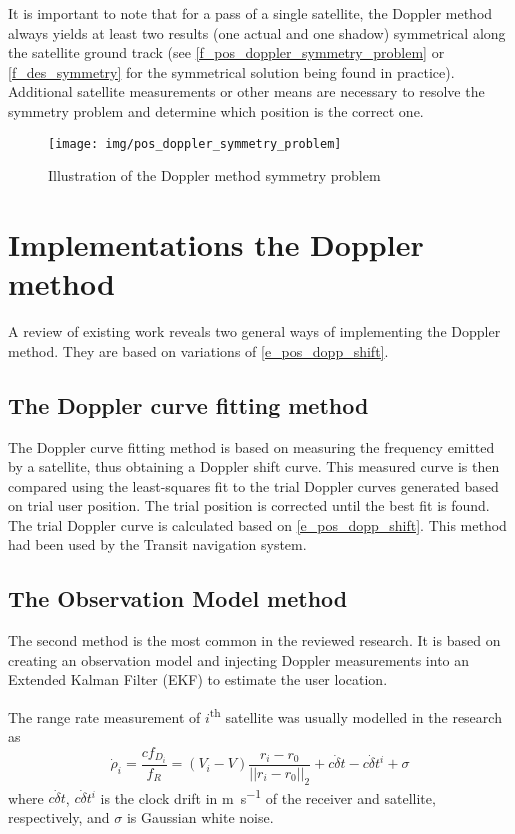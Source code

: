It is important to note that for a pass of a single satellite, the Doppler method always yields at least two results (one actual and one shadow) symmetrical along the satellite ground track (see \autoref{f_pos_doppler_symmetry_problem} or \autoref{f_des_symmetry} for the symmetrical solution being found in practice). Additional satellite measurements or other means are necessary to resolve the symmetry problem and determine which position is the correct one.

\begin{figure}
    \centering
    \texttt{[image: img/pos\_doppler\_symmetry\_problem]}
    \caption{Illustration of the Doppler method symmetry problem\cite{sop09}}
    \label{f_pos_doppler_symmetry_problem}
\end{figure}



\section{Implementations the Doppler method}
A review of existing work reveals two general ways of implementing the Doppler method. They are based on variations of \autoref{e_pos_dopp_shift}.

\subsection{The Doppler curve fitting method}
\label{s_pos_curve_fit_method}
The Doppler curve fitting method is based on measuring the frequency emitted by a satellite, thus obtaining a Doppler shift curve. This measured curve is then compared using the least-squares fit to the trial Doppler curves generated based on trial user position. The trial position is corrected until the best fit is found. The trial Doppler curve is calculated based on \autoref{e_pos_dopp_shift}. This method had been used by the Transit navigation system\cite{sat16}.


\subsection{The Observation Model method}
The second method is the most common in the reviewed research. It is based on creating an observation model and injecting Doppler measurements into an Extended Kalman Filter (EKF) to estimate the user location\cite{sop02, sop03, sop13}.

The range rate measurement of $i$\textsuperscript{th} satellite was usually modelled in the research as
\begin{equation}
   \dot\rho_i = \frac{c f_{D_i}}{f_R} = (V_i - V) \frac{r_i - r_0}{||r_i - r_0||_2} + c \dot\delta t - c \dot \delta t^i + \sigma
\end{equation}
where $c \dot\delta t$, $c \dot \delta t^i$ is the clock drift in \unit{\m\per\s} of the receiver and satellite, respectively, and $\sigma$ is Gaussian white noise\cite{sop02}. 



